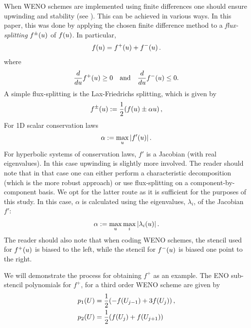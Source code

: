 \documentclass[final]{amsart}
\numberwithin{equation}{section}
\begin{document}
\begin{Rem} When WENO schemes are implemented using finite differences one should ensure upwinding and stability (see \cite{shu1998essentially}).  This can be achieved in various ways.  In this paper, this was done by applying the chosen finite difference method to a \textit{flux-splitting} $f^{\pm}\!\left({u}\right)$ of $f\!\left({u}\right)$.  In particular, 
	\begin{equation}
	f\!\left({u}\right)= f^+\!\left({u}\right) + f^-\!\left({u}\right).
	\end{equation}
	where 
	\begin{equation}
	\frac{d}{du}f^+\!\left({u}\right) \geq 0 \quad \text{and}\quad \frac{d}{du}f^-\!\left({u}\right) \leq 0.
	\end{equation}
	A simple flux-splitting is the Lax-Friedrichs splitting, which is given by 
	\begin{equation}
	f^{\pm}\!\left({u}\right):=\frac{1}{2}\!\left({f\!\left({u}\right)\pm \alpha u}\right),
	\end{equation}
	For 1D scalar conservation laws
	\begin{equation}
	\alpha:=\max_{u}\left|f'\!\left({u}\right)\right|.
	\end{equation}
	For hyperbolic systems of conservation laws, ${f}'$ is a Jacobian (with real eigenvalues).  In this case  upwinding is slightly more involved.  The reader should note that in that case one can either perform a characteristic decomposition (which is the more robust approach) or use flux-splitting on a component-by-component basis.  We opt for the latter route as it is sufficient for the purposes of this study.  In this case, $\alpha$ is calculated using the eigenvalues, $\lambda_i$, of the Jacobian ${f}'$:
	\begin{equation}
	\alpha := \max_{u} \max_{i} \left|\lambda_i\!\left({u}\right)\right|.
	\end{equation}
	The reader should also note that when coding WENO schemes,  the stencil used for $f^+\!\left({u}\right)$ is biased to the left, while the stencil for $f^-\!\left({u}\right)$ is biased one point to the right. 
\end{Rem}
We will demonstrate the process for obtaining $f^+$ as an example. The
ENO sub-stencil polynomials for $f^+$, for a third order WENO scheme
are given by
\begin{equation}
\begin{aligned}
p_1\qp{U} &= \frac{1}{2}\qp{-f\qp{U_{j-1}} + 3f\qp{U_j}},\\
p_2\qp{U} &= \frac{1}{2}\qp{f\qp{U_{j}} + f\qp{U_{j+1}}}
\end{aligned}
\end{equation}
\end{document}
